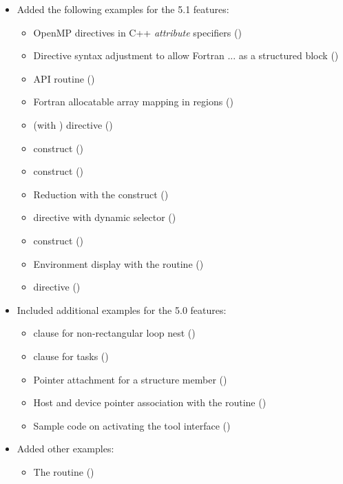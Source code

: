 \begin{itemize}
\item Added the following examples for the 5.1 features:
\begin{itemize}
  \item OpenMP directives in C++ \emph{attribute} specifiers
    ()
  \item Directive syntax adjustment to allow Fortran  ... 
     as a structured block 
      ()
  \item {} API routine
      ()
  \item Fortran allocatable array mapping in  regions ()
  \item {} (with
        ) directive
      ()
  \item {} construct             ()
  \item {} construct           ()
  \item Reduction with the  construct
      ()
  \item  {} directive with dynamic  selector
      ()
  \item {} construct  ()
  \item Environment display with the  routine
      ()
  \item {} directive  ()
\end{itemize}

\item Included additional examples for the 5.0 features:
\begin{itemize}
  \item {} clause for non-rectangular loop nest
      ()
  \item {} clause for tasks ()
  \item Pointer attachment for a structure member ()
  \item Host and device pointer association with the  routine ()
  
  \item Sample code on activating the tool interface 
      ()
\end{itemize}

\item Added other examples:
\begin{itemize}
  \item The  routine ()
\end{itemize}
\end{itemize}


